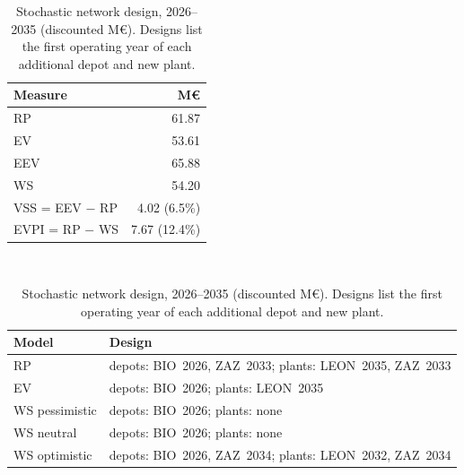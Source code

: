 \begin{table}[t]\centering\small
\caption{Stochastic network design, 2026--2035 (discounted M\euro). Designs list the first operating year of each additional depot and new plant.}\label{tab:strategic}
\begin{tabular}{lr}\toprule Measure & M\euro\\\midrule
RP & 61.87\\
EV & 53.61\\
EEV & 65.88\\
WS & 54.20\\
VSS = EEV $-$ RP & 4.02 (6.5\%)\\
EVPI = RP $-$ WS & 7.67 (12.4\%)\\
\bottomrule\end{tabular}\\[6pt]
\begin{tabular}{ll}\toprule Model & Design\\\midrule
RP & depots: BIO~2026, ZAZ~2033; plants: LEON~2035, ZAZ~2033\\
EV & depots: BIO~2026; plants: LEON~2035\\
WS pessimistic & depots: BIO~2026; plants: none\\
WS neutral & depots: BIO~2026; plants: none\\
WS optimistic & depots: BIO~2026, ZAZ~2034; plants: LEON~2032, ZAZ~2034\\
\bottomrule\end{tabular}\end{table}
